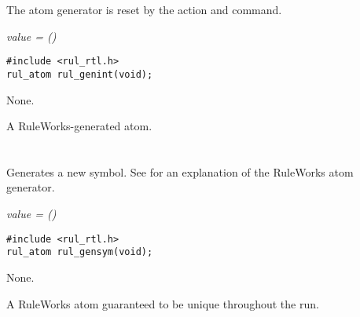 The atom generator is reset by the  action and
command.

\Syntax

\it{value} = ()

\begin{args}
\end{args}

\CBinding
\begin{verbatim}
#include <rul_rtl.h>
rul_atom rul_genint(void);
\end{verbatim}

\Arguments

None.

\ReturnValue

A RuleWorks-generated  atom.

\begin{seealso}

\end{seealso}

\section*{}

Generates a new symbol. See  for an explanation of the
RuleWorks atom generator.

\Syntax

\it{value} = ()

\begin{args}
\end{args}

\CBinding
\begin{verbatim}
#include <rul_rtl.h>
rul_atom rul_gensym(void);
\end{verbatim}

\Arguments

None.

\ReturnValue

A RuleWorks  atom guaranteed to be unique throughout the run.

\begin{seealso}

\end{seealso}

\section*{}

